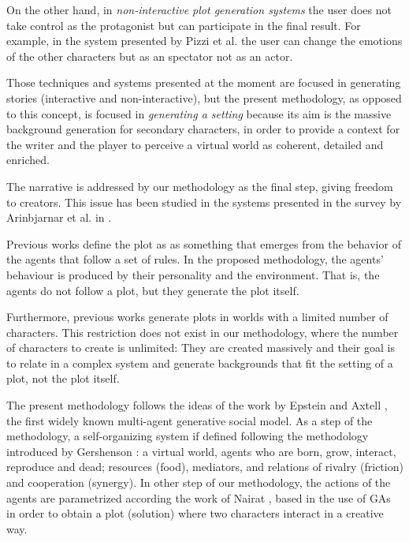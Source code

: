 \documentclass{sig-alternate}
\begin{document}
On the other hand, in {\em non-interactive plot generation systems} the user
does not take control as the protagonist but can participate in the final result. For example, in the system
presented by Pizzi et al. \cite{pizzi2007interactive} the user can change the emotions of the other characters but as an spectator not as an actor.

Those techniques and systems presented at the moment are focused in generating stories (interactive and non-interactive), but the present methodology, as opposed to this concept, is focused in \textit{generating a setting}
because its aim is the massive background generation
for secondary characters, in order to provide a context for the writer and the
player to perceive a virtual world as coherent, detailed and
enriched.

The narrative is addressed by our methodology as the final step, giving freedom to creators. This issue has been studied in the systems presented in
the survey by Arinbjarnar et al. in \cite{ReviewArinbjarnar09}. 

Previous works define the plot as as something that emerges from the behavior of the agents that follow a set of rules. In the proposed methodology, the agents' behaviour is produced by their personality and the environment. That is, the agents do not follow a plot, but they generate the plot itself.

Furthermore,  previous works generate plots in worlds with a limited number of characters. This restriction does not exist in our methodology, where the number of characters to create is unlimited: They are created massively and their goal is to relate in a complex system and generate backgrounds that fit the setting of a plot, not the plot itself.

The present methodology follows the ideas of the work by Epstein and Axtell
\cite{epstein1996growing}, 
the first widely known multi-agent generative social model. As a step of the methodology, a self-organizing system if defined following the methodology introduced by Gershenson
\cite{gershenson2005general}: a virtual world, agents who are born, grow, 
interact, reproduce and dead; resources (food), mediators, and
relations of rivalry (friction) and cooperation (synergy). In other step of our methodology, the actions of the agents are parametrized according the work of Nairat
\cite{nairat2011character}, based in the use of GAs in order to
obtain a plot (solution) where two characters interact in a creative way.
\end{document}
